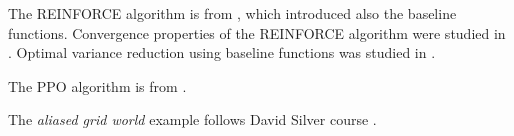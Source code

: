 The REINFORCE algorithm is from \cite{Williams92}, which introduced also the baseline functions. Convergence properties of the REINFORCE algorithm were studied in \cite{PhansalkarT95}. Optimal variance reduction using baseline functions was studied in \cite{greensmith2004variance}.

The PPO algorithm is from \cite{schulman2017proximal}.

The \emph{aliased grid world} example follows David Silver course \cite{DavidSilver-course}.





%



